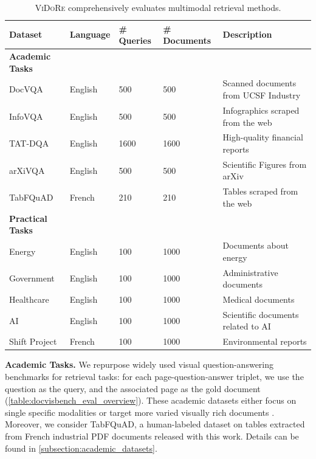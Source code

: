 \begin{table}[ht]
    \centering
    \label{tab:docvisbench}
    \small
    \begin{tabular}{lllll}
        \toprule
        \textbf{Dataset} & \textbf{Language} & \textbf{\# Queries} & \textbf{\# Documents} &\textbf{Description}\\
        \midrule
        \textbf{Academic Tasks} & &\\
        DocVQA   &English  &  500 &500 & Scanned documents from UCSF Industry   \\
        InfoVQA  &English & 500 &500 & Infographics scraped from the web\\
        TAT-DQA  &English  & 1600& 1600 & High-quality financial reports\\
        arXiVQA  &English & 500 &500& Scientific Figures from arXiv\\
        TabFQuAD &French & 210& 210  & Tables scraped from the web \\
        \midrule
        \textbf{Practical Tasks} & \\
        Energy &English & 100 &1000 & Documents about energy\\
        Government &English & 100 &1000 & Administrative documents\\
        Healthcare &English &  100 &1000& Medical documents\\
        AI &English & 100 &1000 & Scientific documents related to AI\\
        Shift Project &French & 100 &1000 & Environmental reports\\
        \bottomrule
    \end{tabular}
    \caption[\textsc{ViDoRe} benchmark overview]{\textsc{ViDoRe} comprehensively evaluates multimodal retrieval methods.}
    \label{table:docvisbench_eval_overview}
\end{table}

\noindent\textbf{Academic Tasks.}
We repurpose widely used visual question-answering benchmarks for retrieval tasks: for each page-question-answer triplet, we use the question as the query, and the associated page as the gold document (\autoref{table:docvisbench_eval_overview}). These academic datasets either focus on single specific modalities  or target more varied visually rich documents . Moreover, we consider TabFQuAD, a human-labeled dataset on tables extracted from French industrial PDF documents released with this work. Details can be found in \autoref{subsection:academic_datasets}.


